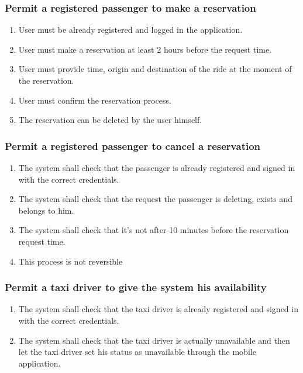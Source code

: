 \subsubsection{Permit a registered passenger to make a reservation}
\begin{enumerate}[label=\bfseries R\arabic*:]
	\item User must be already registered and logged in the application.
	\item User must make a reservation at least 2 hours before the request time.
	\item User must provide time, origin and destination of the ride at the moment of the reservation.
	\item User must confirm the reservation process.
	\item The reservation can be deleted by the user himself.
\end{enumerate}
\subsubsection{Permit a registered passenger to cancel a reservation}
\begin{enumerate}[label=\bfseries R\arabic*:]
	\item The system shall check that the passenger is already registered and signed in with
	the correct	credentials.
	\item The system shall check that the request the passenger is deleting, exists and belongs
	to him.
	\item The system shall check that it's not after 10 minutes before the reservation request time.
	\item This process is not reversible
\end{enumerate}
\subsubsection{Permit a taxi driver to give the system his availability}
\begin{enumerate}[label=\bfseries R\arabic*:]
	\item The system shall check that the taxi driver is already registered and signed in with
	the correct	credentials.
	\item The system shall check that the taxi driver is actually unavailable and then
	let the taxi driver set his status as unavailable through the mobile application.
\end{enumerate}
